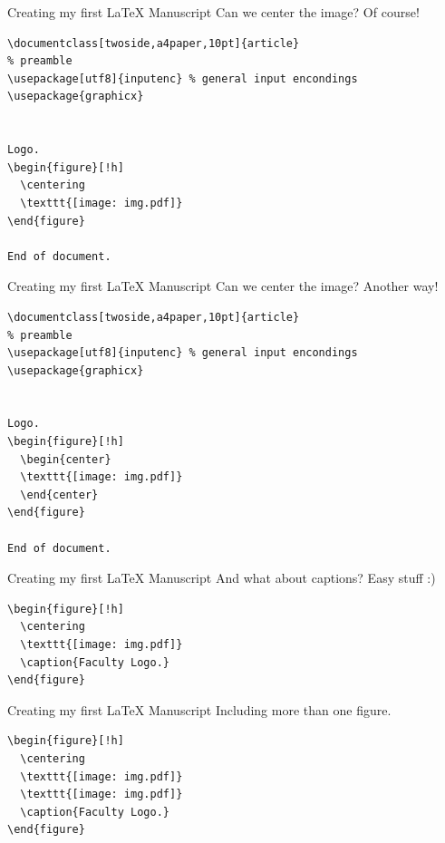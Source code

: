 \begin{frame}[fragile]{Creating my first \LaTeX{} Manuscript}
Can we center the image? Of course!
\footnotesize
\begin{verbatim}
\documentclass[twoside,a4paper,10pt]{article}
% preamble
\usepackage[utf8]{inputenc} % general input encondings
\usepackage{graphicx}


Logo.
\begin{figure}[!h] 
  \centering
  \texttt{[image: img.pdf]}
\end{figure}

End of document.

\end{verbatim}
\end{frame}

\begin{frame}[fragile]{Creating my first \LaTeX{} Manuscript}
Can we center the image? Another way!
\footnotesize
\begin{verbatim}
\documentclass[twoside,a4paper,10pt]{article}
% preamble
\usepackage[utf8]{inputenc} % general input encondings
\usepackage{graphicx}


Logo.
\begin{figure}[!h] 
  \begin{center}
  \texttt{[image: img.pdf]}
  \end{center}
\end{figure}

End of document.

\end{verbatim}
\end{frame}

\begin{frame}[fragile]{Creating my first \LaTeX{} Manuscript}
And what about captions? Easy stuff :)
\footnotesize
\begin{verbatim}
\begin{figure}[!h] 
  \centering                  
  \texttt{[image: img.pdf]}
  \caption{Faculty Logo.}
\end{figure}
\end{verbatim}
\end{frame}

\begin{frame}[fragile]{Creating my first \LaTeX{} Manuscript}
Including more than one figure.
\footnotesize
\begin{verbatim}
\begin{figure}[!h] 
  \centering                  
  \texttt{[image: img.pdf]}
  \texttt{[image: img.pdf]}
  \caption{Faculty Logo.}
\end{figure}
\end{verbatim}
\end{frame}


